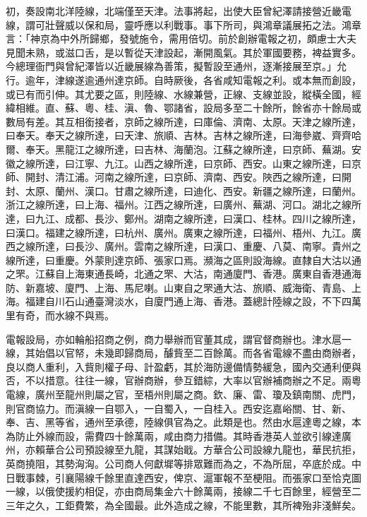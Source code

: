 \begin{pinyinscope}
初，奏設南北洋陸線，北端僅至天津。法事將起，出使大臣曾紀澤請接營近畿電線，謂可壯聲威以保和局，靈呼應以利戰事。事下所司，與鴻章議展拓之法。鴻章言：「神京為中外所歸鄉，發號施令，需用倍切。前於創辦電報之初，頗慮士大夫見聞未熟，或滋口舌，是以暫從天津設起，漸開風氣。其於軍國要務，裨益實多。今總理衙門與曾紀澤皆以近畿展線為善策，擬暫設至通州，逐漸接展至京。」允行。逾年，津線遂逾通州達京師。自時厥後，各省咸知電報之利。或本無而創設，或已有而引伸。其尤要之區，則陸線、水線兼營，正線、支線並設，縱橫全國，經緯相維。直、蘇、粵、桂、滇、魯、鄂諸省，設局多至二十餘所，餘省亦十餘局或數局有差。其互相銜接者，京師之線所達，曰庫倫、濟南、太原。天津之線所達，曰奉天。奉天之線所達，曰天津、旅順、吉林。吉林之線所達，曰海參崴、齊齊哈爾、奉天。黑龍江之線所達，曰吉林、海蘭泡。江蘇之線所達，曰京師、蕪湖。安徽之線所達，曰江寧、九江。山西之線所達，曰京師、西安。山東之線所達，曰京師、開封、清江浦。河南之線所達，曰京師、濟南、西安。陜西之線所達，曰開封、太原、蘭州、漢口。甘肅之線所達，曰迪化、西安。新疆之線所達，曰蘭州。浙江之線所達，曰上海、福州。江西之線所達，曰廣州、蕪湖、河口。湖北之線所達，曰九江、成都、長沙、鄭州。湖南之線所達，曰漢口、桂林。四川之線所達，曰漢口。福建之線所達，曰杭州、廣州。廣東之線所達，曰福州、梧州、九江。廣西之線所達，曰長沙、廣州。雲南之線所達，曰漢口、重慶、八莫、南寧。貴州之線所達，曰重慶。外蒙則達京師、張家口焉。瀕海之區則設海線。直隸自大沽以通之罘。江蘇自上海東通長崎，北通之罘、大沽，南通廈門、香港。廣東自香港通海防、新嘉坡、廈門、上海、馬尼喇。山東自之罘通大沽、旅順、威海衛、青島、上海。福建自川石山通臺灣淡水，自廈門通上海、香港。蓋總計陸線之設，不下四萬里有奇，而水線不與焉。

電報設局，亦如輪船招商之例，商力舉辦而官董其成，謂官督商辦也。津水扈一線，其始倡以官帑，未幾即歸商局，醵貲至二百餘萬。而各省電線不盡由商辦者，良以商人重利，入貲則權子母、計盈虧，其於海防邊備情勢緩急，國內交通利便與否，不以措意。往往一線，官辦商辦，參互錯綜，大率以官辦補商辦之不足。兩粵電線，廣州至龍州則屬之官，至梧州則屬之商。欽、廉、雷、瓊及鎮南關、虎門，則官商協力。而滇線一自鄂入，一自蜀入，一自桂入。西安迄嘉峪關、甘、新、奉、吉、黑等省，通州至承德，陸線俱官為之。此類是也。然由水扈達粵之線，本為防止外線而設，需費四十餘萬兩，咸由商力措備。其時香港英人並欲引線達廣州，亦賴華合公司預設線至九龍，其謀始戢。方華合公司設線九龍也，華民抗拒，英商撓阻，其勢洶洶。公司商人何獻墀等排眾難而為之，不為所屈，卒底於成。中日戰事棘，引襄陽線千餘里直達西安，俾京、滬軍報不至梗阻。而張家口至恰克圖一線，以俄使援約相促，亦由商局集金六十餘萬兩，接線二千七百餘里，經營至二三年之久，工鉅費繁，為全國最。此外造成之線，不能里數，其所裨殆非淺鮮矣。


\end{pinyinscope}
